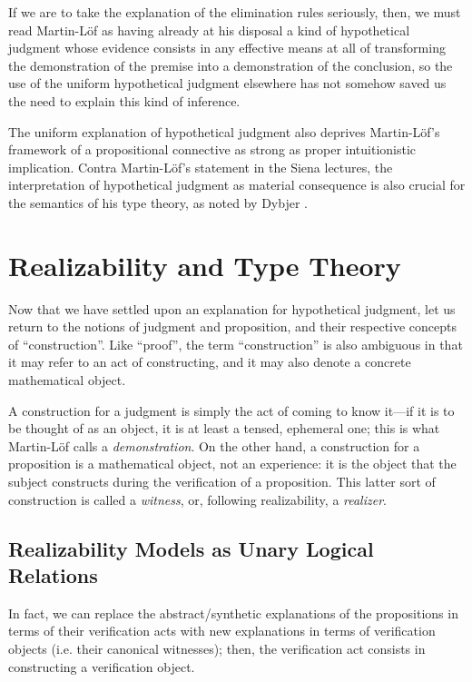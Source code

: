 \documentclass[11pt]{amsart}
\theoremstyle{definition}
\theoremstyle{remark}
\numberwithin{equation}{section}
\begin{document}
If we are to take the explanation of the elimination rules seriously, then, we
must read Martin-L\"of as having already at his disposal a kind of hypothetical
judgment whose evidence consists in any effective means at all of transforming
the demonstration of the premise into a demonstration of the conclusion, so the
use of the uniform hypothetical judgment elsewhere has not somehow saved us the
need to explain this kind of inference.

The uniform explanation of hypothetical judgment also deprives Martin-L\"of's
framework of a propositional connective as strong as proper intuitionistic
implication. Contra Martin-L\"of's statement in the Siena lectures, the
interpretation of hypothetical judgment as material consequence is also crucial
for the semantics of his type theory, as noted by Dybjer \cite{dybjer:testing}.

\section{Realizability and Type Theory}

Now that we have settled upon an explanation for hypothetical judgment, let us
return to the notions of judgment and proposition, and their respective concepts
of ``construction''. Like ``proof'', the term ``construction'' is also ambiguous
in that it may refer to an act of constructing, and it may also denote a
concrete mathematical object.

A construction for a judgment is simply the act of coming to know it---if it is
to be thought of as an object, it is at least a tensed, ephemeral one; this is
what Martin-L\"of calls a \emph{demonstration}. On the other hand, a
construction for a proposition is a mathematical object, not an experience: it
is the object that the subject constructs during the verification of a
proposition. This latter sort of construction is called a \emph{witness}, or,
following realizability, a \emph{realizer}.

\subsection{Realizability Models as Unary Logical Relations}

In fact, we can replace the abstract/synthetic explanations of the propositions
in terms of their verification acts with new explanations in terms of
verification objects (i.e. their canonical witnesses); then, the verification
act consists in constructing a verification object.
\end{document}
